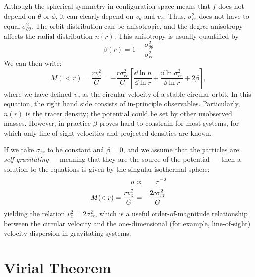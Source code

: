 Although the spherical symmetry in configuration space means that $f$
does not depend on $\theta$ or $\phi$, it can clearly depend on
$v_\theta$ and $v_\phi$. Thus, $\sigma_{rr}^2$ does not have to equal
$\sigma_{\theta\theta}^2$. The orbit distribution can be anisotropic,
and the degree anisotropy affects the radial distribution $n(r)$.
This anisotropy is usually quantified by
\begin{equation}
\beta(r)  = 1 - \frac{\sigma_{\theta\theta}^2}{\sigma_{rr}^2}
\end{equation}
We can then write:
\begin{equation}
 \label{eq:sphericalmass}
M(<r) = \frac{rv_c^2}{G} = - \frac{r \sigma_{rr}^2}{G}
\left[\frac{\dd{\ln n}}{\dd{\ln r}}
+ \frac{\dd{\ln \sigma_{rr}^2}}{\dd{\ln r}} + 2 \beta\right],
\end{equation}
where we have defined $v_c$ as the circular velocity of a stable
circular orbit. In this equation, the right hand side consists of
in-principle observables. Particularly, $n(r)$ is the tracer density;
the potential could be set by other unobserved masses. However, in
practice $\beta$ proves hard to constrain for most systems, for which
only line-of-sight velocities and projected densities are known.

If we take $\sigma_{rr}$ to be constant and $\beta=0$, and we assume
that the particles are {\it self-gravitating} --- meaning that they
are the source of the potential --- then a solution to the equations
is given by the singular isothermal sphere:
\begin{eqnarray}
n &\propto& r^{-2} \cr
M(<r) = \frac{rv_c^2}{G} &=& \frac{2 r \sigma_{rr}^2}{G}
\end{eqnarray}
yielding the relation $v_c^2 = 2\sigma_{rr}^2$, which is a useful
order-of-magnitude relationship between the circular velocity and the
one-dimensional (for example, line-of-sight) velocity dispersion in
gravitating systems.

\section{Virial Theorem}

